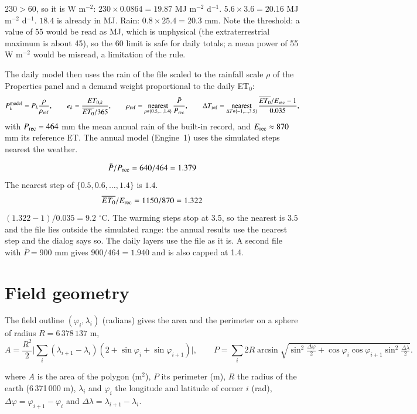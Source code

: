 \sol  $230>60$, so it is W m$^{-2}$: $230\times0.0864=19.87$ MJ m$^{-2}$ d$^{-1}$. $5.6\times3.6=20.16$ MJ m$^{-2}$ d$^{-1}$. $18.4$ is already in MJ. Rain: $0.8\times25.4=20.3$ mm. Note the threshold: a value of 55 would be read as MJ, which is unphysical (the extraterrestrial maximum is about 45), so the 60 limit is safe for daily totals; a mean power of 55 W m$^{-2}$ would be misread, a limitation of the rule. \finans


The daily model then uses the rain of the file scaled to the rainfall scale $\rho$ of the Properties panel and a demand weight proportional to the daily ET$_0$:
\begin{equation}P_k^{\rm model}=P_k\frac{\rho}{\rho_{\rm ref}},\qquad e_k=\frac{ET_{0,k}}{\overline{ET_0}/365},\qquad\rho_{\rm ref}=\mathop{\mathrm{nearest}}_{\rho\in\{0.5,\dots,1.4\}}\frac{\bar P}{P_{\rm rec}},\qquad\Delta T_{\rm ref}=\mathop{\mathrm{nearest}}_{\Delta T\in\{-1,\dots,3.5\}}\frac{\overline{ET_0}/E_{\rm rec}-1}{0.035},\end{equation}
with $P_{\rm rec}=464$ mm the mean annual rain of the built-in record, and $E_{\rm rec}\approx870$ mm its reference ET. The annual model (Engine~1) uses the simulated steps nearest the weather.

\sol {}\ans \[\bar P/P_{\rm rec}=640/464=1.379\]
The nearest step of $\{0.5,0.6,\dots,1.4\}$ is $1.4$. \[\overline{ET_0}/E_{\rm rec}=1150/870=1.322\]
$(1.322-1)/0.035=9.2$ $^\circ$C. The warming steps stop at 3.5, so the nearest is $3.5$ and the file lies outside the simulated range: the annual results use the nearest step and the dialog says so. The daily layers use the file as it is. A second file with $\bar P=900$ mm gives $900/464=1.940$ and is also capped at 1.4. \finans


\section{Field geometry}
The field outline $(\varphi_i,\lambda_i)$ (radians) gives the area and the perimeter on a sphere of radius $R=6\,378\,137$ m,
\begin{equation}A=\frac{R^2}2\Big|\sum_i(\lambda_{i+1}-\lambda_i)(2+\sin\varphi_i+\sin\varphi_{i+1})\Big|,\qquad P=\sum_i2R\arcsin\sqrt{\sin^2\tfrac{\Delta\varphi}{2}+\cos\varphi_i\cos\varphi_{i+1}\sin^2\tfrac{\Delta\lambda}{2}}.\end{equation}
\par\noindent where $A$ is the area of the polygon (m$^2$), $P$ its perimeter (m), $R$ the radius of the earth (6\,371\,000 m), $\lambda_i$ and $\varphi_i$ the longitude and latitude of corner $i$ (rad), $\Delta\varphi=\varphi_{i+1}-\varphi_i$ and $\Delta\lambda=\lambda_{i+1}-\lambda_i$.


